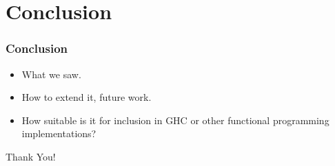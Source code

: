 \documentclass{beamer}
\begin{document}
\section{Conclusion}

\begin{frame}
  \frametitle{Conclusion}
  \begin{itemize}
  \item What we saw.
  \item How to extend it, future work.
  \item How suitable is it for inclusion in GHC or other functional
    programming implementations?
  \end{itemize}
\end{frame}

\begin{frame}
\Huge{\centerline{Thank You!}}
\end{frame}





\end{document}
